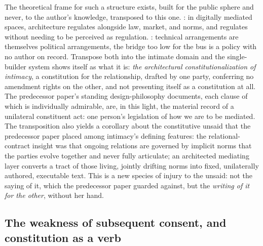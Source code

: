 \documentclass[11pt,a4paper]{article}
\newcommand{\term}[1]{\textit{\textcolor{pinkitalic}{#1}}}
\begin{document}
The theoretical frame for such a structure exists, built for the public sphere and never, to the author's knowledge, transposed to this one. \textcite{lessig2006code}: in digitally mediated spaces, architecture regulates alongside law, market, and norms, and regulates without needing to be perceived as regulation. \textcite{winner1980artifacts}: technical arrangements are themselves political arrangements, the bridge too low for the bus is a policy with no author on record. Transpose both into the intimate domain and the single-builder system shows itself as what it is: \term{the architectural constitutionalization of intimacy}, a constitution for the relationship, drafted by one party, conferring no amendment rights on the other, and not presenting itself as a constitution at all. The predecessor paper's standing design-philosophy documents, each clause of which is individually admirable, are, in this light, the material record of a unilateral constituent act: one person's legislation of how we are to be mediated. The transposition also yields a corollary about the constitutive unsaid that the predecessor paper placed among intimacy's defining features: the relational-contract insight \parencite{macneil1980new} was that ongoing relations are governed by implicit norms that the parties evolve together and never fully articulate; an architected mediating layer converts a tract of those living, jointly drifting norms into fixed, unilaterally authored, executable text. This is a new species of injury to the unsaid: not the saying of it, which the predecessor paper guarded against, but the \emph{writing of it for the other}, without her hand.

\subsection{The weakness of subsequent consent, and constitution as a verb}
\label{p02:sec:power-consent}
\end{document}
